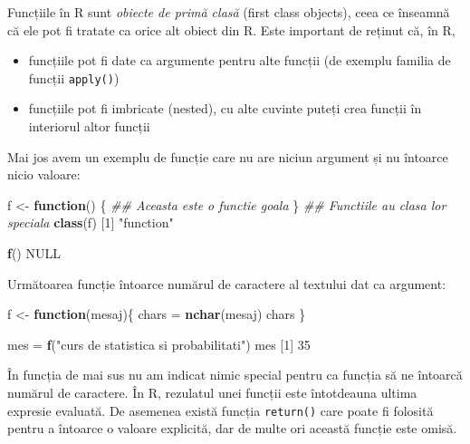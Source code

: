 \documentclass[]{article}
\newenvironment{Shaded}{\begin{snugshade}}{\end{snugshade}}
\newcommand{\CommentTok}[1]{\textcolor[rgb]{0.56,0.35,0.01}{\textit{#1}}}
\newcommand{\ControlFlowTok}[1]{\textcolor[rgb]{0.13,0.29,0.53}{\textbf{#1}}}
\newcommand{\DecValTok}[1]{\textcolor[rgb]{0.00,0.00,0.81}{#1}}
\newcommand{\KeywordTok}[1]{\textcolor[rgb]{0.13,0.29,0.53}{\textbf{#1}}}
\newcommand{\NormalTok}[1]{#1}
\newcommand{\OtherTok}[1]{\textcolor[rgb]{0.56,0.35,0.01}{#1}}
\newcommand{\StringTok}[1]{\textcolor[rgb]{0.31,0.60,0.02}{#1}}
\begin{document}
Funcțiile în R sunt \emph{obiecte de primă clasă} (first class objects),
ceea ce înseamnă că ele pot fi tratate ca orice alt obiect din R. Este
important de reținut că, în R,

\begin{itemize}
\item
  funcțiile pot fi date ca argumente pentru alte funcții (de exemplu
  familia de funcții \texttt{apply()})
\item
  funcțiile pot fi imbricate (nested), cu alte cuvinte puteți crea
  funcții în interiorul altor funcții
\end{itemize}

Mai jos avem un exemplu de funcție care nu are niciun argument și nu
întoarce nicio valoare:

\begin{Shaded}
\begin{Highlighting}[]
\NormalTok{f <-}\StringTok{ }\ControlFlowTok{function}\NormalTok{() \{}
        \CommentTok{## Aceasta este o functie goala}
\NormalTok{\}}
\CommentTok{## Functiile au clasa lor speciala }
\KeywordTok{class}\NormalTok{(f)  }
\NormalTok{[}\DecValTok{1}\NormalTok{] }\StringTok{"function"}

\KeywordTok{f}\NormalTok{()       }
\OtherTok{NULL}
\end{Highlighting}
\end{Shaded}

Următoarea funcție întoarce numărul de caractere al textului dat ca
argument:

\begin{Shaded}
\begin{Highlighting}[]
\NormalTok{f <-}\StringTok{ }\ControlFlowTok{function}\NormalTok{(mesaj)\{}
\NormalTok{  chars =}\StringTok{ }\KeywordTok{nchar}\NormalTok{(mesaj)}
\NormalTok{  chars}
\NormalTok{\}}

\NormalTok{mes =}\StringTok{ }\KeywordTok{f}\NormalTok{(}\StringTok{"curs de statistica si probabilitati"}\NormalTok{)}
\NormalTok{mes}
\NormalTok{[}\DecValTok{1}\NormalTok{] }\DecValTok{35}
\end{Highlighting}
\end{Shaded}

În funcția de mai sus nu am indicat nimic special pentru ca funcția să
ne întoarcă numărul de caractere. În R, rezulatul unei funcții este
întotdeauna ultima expresie evaluată. De asemenea există funcția
\texttt{return()} care poate fi folosită pentru a întoarce o valoare
explicită, dar de multe ori această funcție este omisă.
\end{document}
